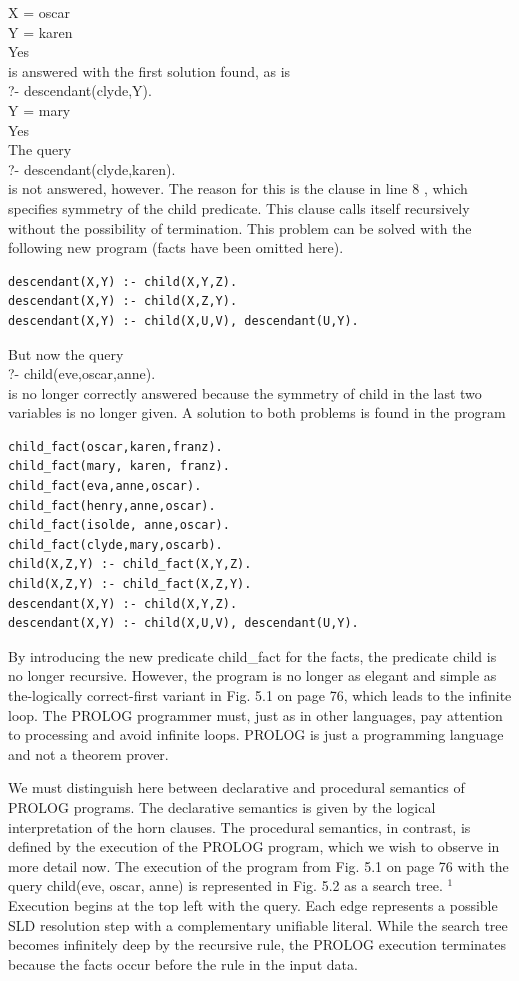\documentclass[10pt]{book}
\begin{document}
X = oscar\\
Y = karen\\
Yes\\
is answered with the first solution found, as is\\
?- descendant(clyde,Y).\\
Y = mary\\
Yes\\
The query\\
?- descendant(clyde,karen).\\
is not answered, however. The reason for this is the clause in line 8 , which specifies symmetry of the child predicate. This clause calls itself recursively without the possibility of termination. This problem can be solved with the following new program (facts have been omitted here).

\begin{verbatim}
descendant(X,Y) :- child(X,Y,Z).
descendant(X,Y) :- child(X,Z,Y).
descendant(X,Y) :- child(X,U,V), descendant(U,Y).
\end{verbatim}

But now the query\\
?- child(eve,oscar,anne).\\
is no longer correctly answered because the symmetry of child in the last two variables is no longer given. A solution to both problems is found in the program

\begin{verbatim}
child_fact(oscar,karen,franz).
child_fact(mary, karen, franz).
child_fact(eva,anne,oscar).
child_fact(henry,anne,oscar).
child_fact(isolde, anne,oscar).
child_fact(clyde,mary,oscarb).
child(X,Z,Y) :- child_fact(X,Y,Z).
child(X,Z,Y) :- child_fact(X,Z,Y).
descendant(X,Y) :- child(X,Y,Z).
descendant(X,Y) :- child(X,U,V), descendant(U,Y).
\end{verbatim}

By introducing the new predicate child\_fact for the facts, the predicate child is no longer recursive. However, the program is no longer as elegant and simple as the-logically correct-first variant in Fig. 5.1 on page 76, which leads to the infinite loop. The PROLOG programmer must, just as in other languages, pay attention to processing and avoid infinite loops. PROLOG is just a programming language and not a theorem prover.

We must distinguish here between declarative and procedural semantics of PROLOG programs. The declarative semantics is given by the logical interpretation of the horn clauses. The procedural semantics, in contrast, is defined by the execution of the PROLOG program, which we wish to observe in more detail now. The execution of the program from Fig. 5.1 on page 76 with the query child(eve, oscar, anne) is represented in Fig. 5.2 as a search tree. ${ }^{1}$ Execution begins at the top left with the query. Each edge represents a possible SLD resolution step with a complementary unifiable literal. While the search tree becomes infinitely deep by the recursive rule, the PROLOG execution terminates because the facts occur before the rule in the input data.
\end{document}

